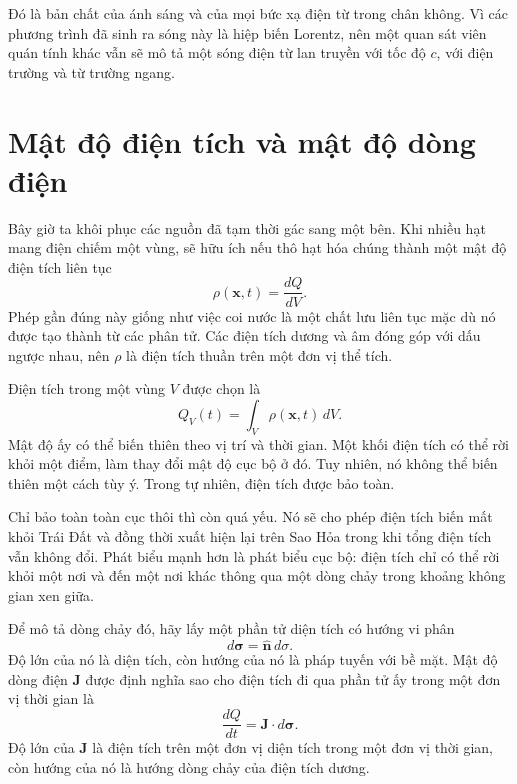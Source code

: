 Đó là bản chất của ánh sáng và của mọi bức xạ điện từ trong chân không. Vì các phương trình đã sinh ra sóng này là hiệp biến Lorentz, nên một quan sát viên quán tính khác vẫn sẽ mô tả một sóng điện từ lan truyền với tốc độ \(c\), với điện trường và từ trường ngang.

\section{Mật độ điện tích và mật độ dòng điện}

Bây giờ ta khôi phục các nguồn đã tạm thời gác sang một bên. Khi nhiều hạt mang điện chiếm một vùng, sẽ hữu ích nếu thô hạt hóa chúng thành một mật độ điện tích liên tục
\begin{equation}
\rho(\mathbf x,t)=\frac{dQ}{dV}.
\end{equation}
Phép gần đúng này giống như việc coi nước là một chất lưu liên tục mặc dù nó được tạo thành từ các phân tử. Các điện tích dương và âm đóng góp với dấu ngược nhau, nên \(\rho\) là điện tích thuần trên một đơn vị thể tích.

Điện tích trong một vùng \(V\) được chọn là
\begin{equation}
Q_V(t)=\int_V\rho(\mathbf x,t)\,dV.
\label{eq:charge-volume}
\end{equation}
Mật độ ấy có thể biến thiên theo vị trí và thời gian. Một khối điện tích có thể rời khỏi một điểm, làm thay đổi mật độ cục bộ ở đó. Tuy nhiên, nó không thể biến thiên một cách tùy ý. Trong tự nhiên, điện tích được bảo toàn.

Chỉ bảo toàn toàn cục thôi thì còn quá yếu. Nó sẽ cho phép điện tích biến mất khỏi Trái Đất và đồng thời xuất hiện lại trên Sao Hỏa trong khi tổng điện tích vẫn không đổi. Phát biểu mạnh hơn là phát biểu cục bộ: điện tích chỉ có thể rời khỏi một nơi và đến một nơi khác thông qua một dòng chảy trong khoảng không gian xen giữa.

Để mô tả dòng chảy đó, hãy lấy một phần tử diện tích có hướng vi phân
\begin{equation}
d\boldsymbol\sigma=\widehat{\mathbf n}\,d\sigma.
\end{equation}
Độ lớn của nó là diện tích, còn hướng của nó là pháp tuyến với bề mặt. Mật độ dòng điện \(\mathbf J\) được định nghĩa sao cho điện tích đi qua phần tử ấy trong một đơn vị thời gian là
\begin{equation}
\frac{dQ}{dt}=\mathbf J\cdot d\boldsymbol\sigma.
\label{eq:current-flux-element}
\end{equation}
Độ lớn của \(\mathbf J\) là điện tích trên một đơn vị diện tích trong một đơn vị thời gian, còn hướng của nó là hướng dòng chảy của điện tích dương.

